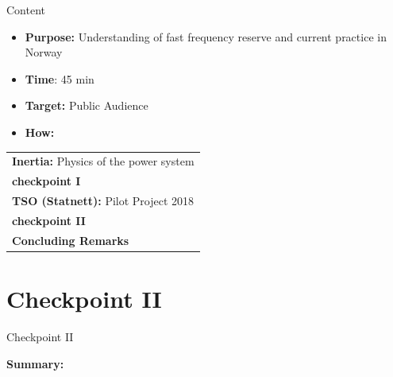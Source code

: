 \documentclass{beamer}
\begin{document}
\begin{frame}
\titlepage
\end{frame}
\begin{frame}{Content}
\begin{itemize}
\item \textbf{Purpose:} Understanding of fast frequency reserve and current practice in Norway
\item \textbf{Time}: 45 min
\item \textbf{Target:} Public Audience
\item \textbf{How:} 
\end{itemize}
\begin{center}
\begin{tabular}{|l|} 
\hline
\rowcolor{Gray} \textbf{Inertia:} Physics of the power system \\
 \textbf{checkpoint I}\\
 \rowcolor{Gray} \textbf{TSO (Statnett):} Pilot Project 2018\\
 \textbf{checkpoint II}\\
 \rowcolor{Gray} \textbf{Concluding Remarks}\\
\hline
\end{tabular}
\end{center}



\end{frame}





\section{Checkpoint II}
\begin{frame}{Checkpoint II}
\centering \begin{block}{}
\textbf{Summary:}
\end{block} 
\end{frame}
\end{document}

